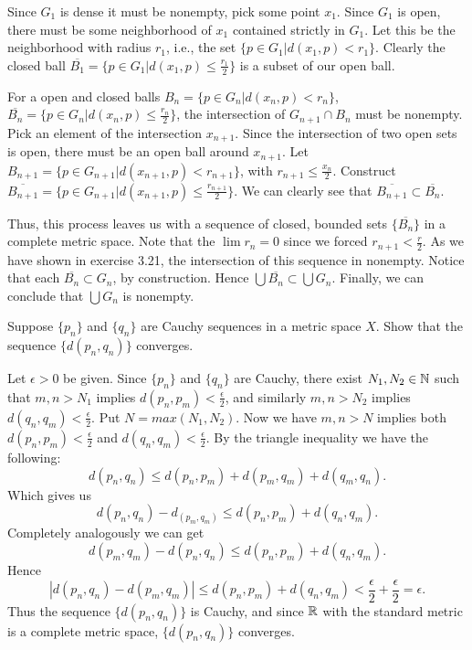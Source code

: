 \begin{solution}
  Since $G_1$ is dense it must be nonempty, pick some point $x_1$.
  Since $G_1$ is open, there must be some neighborhood of $x_1$ contained strictly in $G_1$.
  Let this be the neighborhood with radius $r_1$, i.e., the set $\{p \in G_1 | d(x_1, p) < r_1\}$.
  Clearly the closed ball $\overline{B_1} = \{p \in G_1 | d(x_1, p) \le \frac{r_1}{2}\}$ is a subset of our open ball.

  For a open and closed balls $B_n = \{p \in G_n | d(x_n, p) < r_n\}$, $\overline{B_n} = \{p \in G_n | d(x_n, p) \le \frac{r_n}{2}\}$, the intersection of $G_{n + 1} \cap B_n$ must be nonempty.
  Pick an element of the intersection $x_{n + 1}$.
  Since the intersection of two open sets is open, there must be an open ball around $x_{n + 1}$.
  Let $B_{n + 1} = \{p \in G_{n + 1} | d(x_{n + 1}, p) < r_{n + 1}\}$, with $r_{n + 1} \le \frac{x_n}{2}$.
  Construct $\overline{B_{n + 1}} = \{p \in G_{n + 1} | d(x_{n + 1}, p) \le \frac{r_{n + 1}}{2}\}$.
  We can clearly see that $\overline{B_{n + 1}} \subset \overline{B_n}$.

  Thus, this process leaves us with a sequence of closed, bounded sets $\{\overline{B_n}\}$ in a complete metric space.
  Note that the $\lim r_n = 0$ since we forced $r_{n + 1} < \frac{r}{2}$.
  As we have shown in exercise 3.21, the intersection of this sequence in nonempty.
  Notice that each $\overline{B_n} \subset G_n$, by construction.
  Hence $\bigcup \overline{B_n} \subset \bigcup G_n$.
  Finally, we can conclude that $\bigcup G_n$ is nonempty.
\end{solution}

\begin{problem}
  Suppose $\{p_n\}$ and $\{q_n\}$ are Cauchy sequences in a metric space $X$.
  Show that the sequence $\{d(p_n, q_n)\}$ converges.
\end{problem}

\begin{solution}
  Let $\epsilon > 0$ be given.
  Since $\{p_n\}$ and $\{q_n\}$ are Cauchy, there exist $N_1, N_2 \in \mathbb{N}$ such that $m, n > N_1$ implies $d(p_n, p_m) < \frac{\epsilon}{2}$, and similarly $m, n > N_2$ implies $d(q_n, q_m) < \frac{\epsilon}{2}$.
  Put $N = max(N_1, N_2)$.
  Now we have $m, n > N$ implies both $d(p_n, p_m) < \frac{\epsilon}{2}$ and $d(q_n, q_m) < \frac{\epsilon}{2}$.
  By the triangle inequality we have the following:
  \[d(p_n, q_n) \le d(p_n, p_m) + d(p_m, q_m) + d(q_m, q_n).\]
  Which gives us
  \[d(p_n, q_n) - d_(p_m, q_m) \le d(p_n, p_m) + d(q_n, q_m).\]
  Completely analogously we can get
  \[d(p_m, q_m) - d(p_n, q_n) \le d(p_n, p_m) + d(q_n, q_m).\]
  Hence
  \[|d(p_n, q_n) - d(p_m, q_m)| \le d(p_n, p_m) + d(q_n, q_m) < \frac{\epsilon}{2} + \frac{\epsilon}{2} = \epsilon.\]
  Thus the sequence $\{d(p_n, q_n)\}$ is Cauchy, and since $\mathbb{R}$ with the standard metric is a complete metric space, $\{d(p_n, q_n)\}$ converges.
\end{solution}

